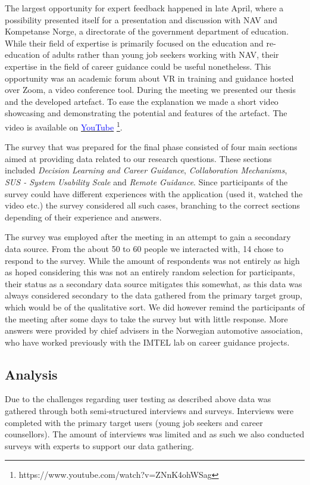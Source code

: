 The largest opportunity for expert feedback happened in late April, where a possibility presented itself for a presentation and discussion with NAV and Kompetanse Norge, a directorate of the government department of education. While their field of expertise is primarily focused on the education and re-education of adults rather than young job seekers working with NAV, their expertise in the field of career guidance could be useful nonetheless.
This opportunity was an academic forum about VR in training and guidance hosted over Zoom, a video conference tool. During the meeting we presented our thesis and the developed artefact. To ease the explanation we made a short video showcasing and demonstrating the potential and features of the artefact. The video is available on  \href{https://www.youtube.com/watch?v=ZNnK4ohWSag}{\textcolor{blue}{YouTube}} \footnote{https://www.youtube.com/watch?v=ZNnK4ohWSag}. 

The survey that was prepared for the final phase consisted of four main sections aimed at providing data related to our research questions. These sections included \textit{Decision Learning and Career Guidance}, \textit{Collaboration Mechanisms}, \textit{SUS - System Usability Scale} and \textit{Remote Guidance}. Since participants of the survey could have different experiences with the application (used it, watched the video etc.) the survey considered all such cases, branching to the correct sections depending of their experience and answers. 

The survey was employed after the meeting in an attempt to gain a secondary data source. From the about 50 to 60 people we interacted with, 14 chose to respond to the survey. While the amount of respondents was not entirely as high as hoped considering this was not an entirely random selection for participants, their status as a secondary data source mitigates this somewhat, as this data was always considered secondary to the data gathered from the primary target group, which would be of the qualitative sort. We did however remind the participants of the meeting after some days to take the survey but with little response. More answers were provided by chief advisers in the Norwegian automotive association, who have worked previously with the IMTEL lab on career guidance projects.    



\subsection{Analysis}
Due to the challenges regarding user testing as described above data was gathered through both semi-structured interviews and surveys. Interviews were completed with the primary target users (young job seekers and career counsellors). The amount of interviews was limited and as such we also conducted surveys with experts to support our data gathering.      


